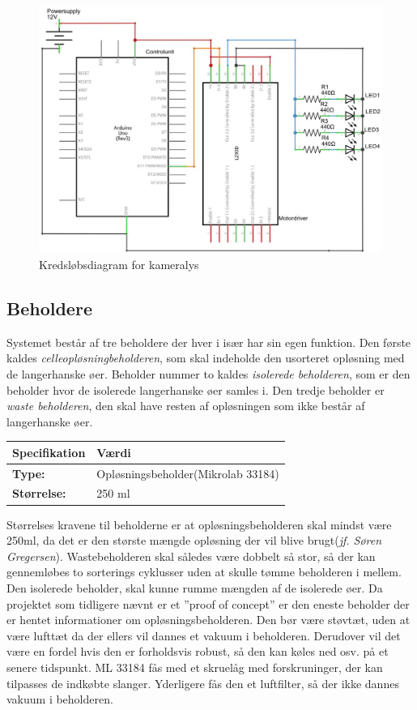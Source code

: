  \begin{figure}[H]
	\centering
	\includegraphics[width=1\textwidth]{billeder/Hardware/diagrammer/LEDdiagram.JPG}
	\caption{Kredsløbsdiagram for kameralys}
	\label{fig:LEDdiagram}
\end{figure} 


\newpage
\subsection{Beholdere}
Systemet består af tre beholdere der hver i især har sin egen funktion. Den første kaldes \textit{celleopløsningbeholderen}, som skal indeholde den usorteret opløsning med de langerhanske øer. Beholder nummer to kaldes \textit{isolerede beholderen}, som er den beholder hvor de isolerede langerhanske øer samles i. Den tredje beholder er \textit{waste beholderen}, den skal have resten af opløsningen som ikke består af langerhanske øer.
\begin{center}
		\begin{longtable}{ | m{6.5cm} | m{6.5cm}| } 
			\hline
			\textbf{Specifikation} &\textbf{Værdi} \\ 
			\hline
			\textbf{Type:} & Opløsningsbeholder(Mikrolab 33184) \\ 
			\hline
			\textbf{Størrelse:} & 250 ml \\ 
			\hline
		\end{longtable}
\end{center}
Størrelses kravene til beholderne er at opløsningsbeholderen skal mindst være 250ml, da det er den største mængde opløsning der vil blive brugt(\textit{jf. Søren Gregersen}). Wastebeholderen skal således være dobbelt så stor, så der kan gennemløbes to sorterings cyklusser uden at skulle tømme beholderen i mellem. Den isolerede beholder, skal kunne rumme mængden af de isolerede øer. Da projektet som tidligere nævnt er et ”proof of concept” er den eneste beholder der er hentet informationer om opløsningsbeholderen. Den bør være støvtæt, uden at være lufttæt da der ellers vil dannes et vakuum i beholderen. Derudover vil det være en fordel hvis den er forholdsvis robust, så den kan køles ned osv. på et senere tidspunkt. ML 33184 fås med et skruelåg med forskruninger, der kan tilpasses de indkøbte slanger. Yderligere fås den et luftfilter, så der ikke dannes vakuum i beholderen.

